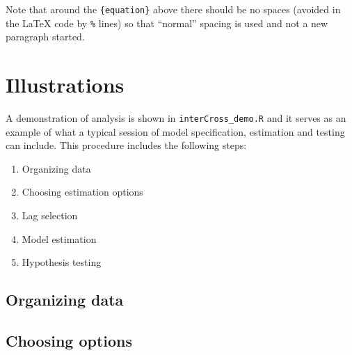 \documentclass[article]{jss}
\begin{document}
\begin{leftbar}
Note that around the \verb|{equation}| above there should be no spaces (avoided
in the {\LaTeX} code by \verb|%| lines) so that ``normal'' spacing is used and
not a new paragraph started.
\end{leftbar}




\section{Illustrations} \label{sec:illustrations}

A demonstration of analysis is shown in \verb|interCross_demo.R| and it serves as an example of what a typical session of model specification, estimation and testing can include. This procedure includes the following steps:

\begin{enumerate}
\item Organizing data
\item Choosing estimation options
\item Lag selection
\item Model estimation
\item Hypothesis testing
\end{enumerate}


\subsection{Organizing data} \label{subsec:data}


\subsection{Choosing options} \label{subsec:options}
\end{document}
